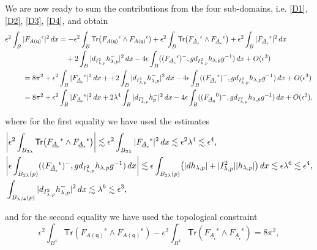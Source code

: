 \documentclass[11pt]{article}
\numberwithin{equation}{section} \setlength{\topmargin}{-35pt}
\newcommand{\q}{\mathsf{q}}
\newcommand{\tr}{\mathsf{Tr}}
\begin{document}
\medskip
\noindent We are now ready to sum the contributions from the four
sub-domains, i.e. \eqref{D1}, \eqref{D2}, \eqref{D3}, \eqref{D4},
and obtain
\begin{align}
\label{expansion} \epsilon^2\int_B |{F_{A(\q)}}^{\epsilon}|^2\,dx&=-
\epsilon^2\int _{B}\tr\bigl({F_{A(\q)}}^{\epsilon}\wedge
{F_{A(\q)}}^{\epsilon})+ \epsilon^2\int_{B}\tr\bigl({F_{\underline
A_\epsilon}}^{\epsilon}\wedge
{F_{\underline A_\epsilon}}^{\epsilon}\bigr)+\epsilon^2\int_{B} |{F_{\underline{A}_{\epsilon}}}^{\epsilon}|^2\,dx\notag\\
&\quad+2\int_{B}|d_{I^2_{\lambda,p}}h_{\lambda,p}^-|^2\,dx
-4\epsilon\int_{B}(({F_{\underline
A_\epsilon}}^{\epsilon})^-,gd_{I^2_{\lambda,p}}h_{\lambda,p}g^{-1})\,dx
+O(\epsilon^3)\notag\\
= 8\pi^2+\epsilon^2&\int_{B}
|{F_{\underline{A}_{\epsilon}}}^{\epsilon}|^2\,dx+
+2\int_{B}|d_{I^2_{\lambda,p}}h_{\lambda,p}^-|^2\,dx
-4\epsilon\int_{B}(({F_{\underline
A_\epsilon}}^{\epsilon})^-,gd_{I^2_{\lambda,p}}h_{\lambda,p}g^{-1})\,dx
+O(\epsilon^3)\notag\\
= 8\pi^2+ \epsilon^2&\int_{B}
|{F_{\underline{A}_{\epsilon}}}^{\epsilon}|^2\,dx+2\lambda^4
\int_{B}|d_{I^2_{\lambda,p}}h_{p}^-|^2\,dx
-4\epsilon\int_{B}(({F_{\underline
A_0}}^0)^-,gd_{I^2_{\lambda,p}}h_{\lambda,p}g^{-1})\,dx
+O(\epsilon^3),
\end{align}

\noindent where for the first equality we have used the estimates
\begin{align}
&\biggl|\epsilon^2\int_{B_{2\lambda}}\tr\bigl({F_{\underline
A_\epsilon}}^{\epsilon}\wedge {F_{\underline
A_\epsilon}}^{\epsilon}\bigr)\biggr|\lesssim
\epsilon^2\int_{B_{2\lambda}}
|{F_{\underline{A}_{\epsilon}}}^{\epsilon}|^2\,dx\lesssim
\epsilon^2\lambda^4\lesssim \epsilon^4,\notag\\
&\biggl|\epsilon\int_{B_{2\lambda}(p)}(({F_{\underline
A_{\epsilon}}}^{\epsilon})^-,
gd_{I^2_{\lambda,p}}h_{\lambda,p}g^{-1})\,dx \biggr| \lesssim
\epsilon\int_{B_{2\lambda}(p)}\bigl(|dh_{\lambda,p}|+|I^2_{\lambda,p}||h_{\lambda,p}|\bigr)\,dx
\lesssim \epsilon\lambda^6\lesssim\epsilon^{4},\notag\\
&\int_{B_{\lambda/4}(p)}|d_{I^2_{\lambda,p}}h_{\lambda,p}^-|^2\,dx\lesssim\lambda^6\lesssim\epsilon^3,
\notag
\end{align}

\noindent and for the second equality we have used the  topological
constraint
\begin{equation}
\label{constraint}
\epsilon^2\int_{B^4}\tr({F_{A(\q)}}^{\epsilon}\wedge
{F_{A(\q)}}^{\epsilon}) -\epsilon^2\int_{B^4}\tr({F_{\underline
A_\epsilon}}^{\epsilon}\wedge {F_{\underline
A_\epsilon}}^{\epsilon})=8\pi^2,
\end{equation}
\end{document}
